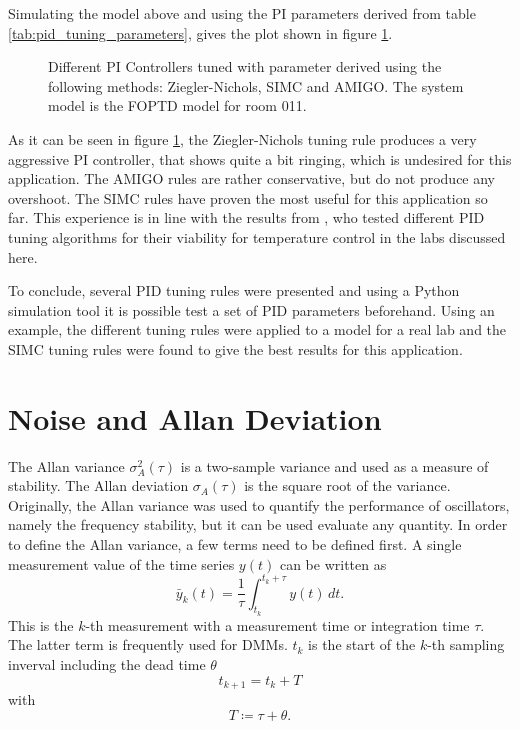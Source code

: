 Simulating the model above and using the PI parameters derived from table \ref{tab:pid_tuning_parameters}, gives the plot shown in figure \ref{fig:pid_controller_comparison}.

\begin{figure}[ht]
    \centering
    
    \caption{Different PI Controllers tuned with parameter derived using the following methods: Ziegler-Nichols, SIMC and AMIGO. The system model is the FOPTD model for room 011.}
    \label{fig:pid_controller_comparison}
\end{figure}

As it can be seen in figure \ref{fig:pid_controller_comparison}, the Ziegler-Nichols tuning rule produces a very aggressive PI controller, that shows quite a bit ringing, which is undesired for this application. The AMIGO rules are rather conservative, but do not produce any overshoot. The SIMC rules have proven the most useful for this application so far. This experience is in line with the results from \citeauthor{liebmann_thesis} \cite{liebmann_thesis}, who tested different PID tuning algorithms for their viability for temperature control in the labs discussed here.

To conclude, several PID tuning rules were presented and using a Python simulation tool it is possible test a set of PID parameters beforehand. Using an example, the different tuning rules were applied to a model for a real lab and the SIMC tuning rules were found to give the best results for this application.

\clearpage
\section{Noise and Allan Deviation}
\label{sec:allan_deviation}
The Allan variance \cite{adev} $\sigma_A^2(\tau)$ is a two-sample variance and used as a measure of stability. The Allan deviation $\sigma_A(\tau)$ is the square root of the variance. Originally, the Allan variance was used to quantify the performance of oscillators, namely the frequency stability, but it can be used evaluate any quantity. In order to define the Allan variance, a few terms need to be defined first. A single measurement value of the time series $y(t)$ can be written as
\begin{equation}
    \bar y_k(t) = \frac{1}{\tau} \int_{t_{k}}^{t_{k}+\tau} y(t)\,dt . \label{eqn:allan_variance_measurement}
\end{equation}
This is the $k$-th measurement with a measurement time or integration time $\tau$. The latter term is frequently used for DMMs. $t_k$ is the start of the $k$-th sampling inverval including the dead time $\theta$
\begin{equation}
    t_{k+1} = t_k + T
\end{equation}
with
\begin{equation}
    T \coloneqq \tau + \theta .
\end{equation}

